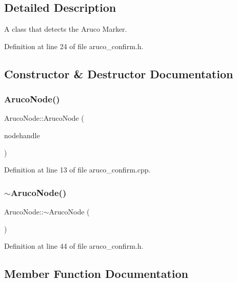 \subsection{Detailed Description}
A class that detects the Aruco Marker. 

Definition at line 24 of file aruco\+\_\+confirm.\+h.



\subsection{Constructor \& Destructor Documentation}
\mbox{\label{class_aruco_node_ad539e5027a1d41e9e62f354db9ec40aa}} 
\subsubsection{\texorpdfstring{Aruco\+Node()}{ArucoNode()}}
{\footnotesize\ttfamily Aruco\+Node\+::\+Aruco\+Node (\begin{DoxyParamCaption}\item[{ros\+::\+Node\+Handle $\ast$}]{nodehandle }\end{DoxyParamCaption})}



Definition at line 13 of file aruco\+\_\+confirm.\+cpp.

\mbox{\label{class_aruco_node_a134694163a28530a800198e2c039eb25}} 
\subsubsection{\texorpdfstring{$\sim$\+Aruco\+Node()}{~ArucoNode()}}
{\footnotesize\ttfamily Aruco\+Node\+::$\sim$\+Aruco\+Node (\begin{DoxyParamCaption}{ }\end{DoxyParamCaption})\hspace{0.3cm}{\ttfamily [inline]}}



Definition at line 44 of file aruco\+\_\+confirm.\+h.



\subsection{Member Function Documentation}
\mbox{\label{class_aruco_node_a38f5977cae0f0cc0d30449db22b2e9d6}} 
